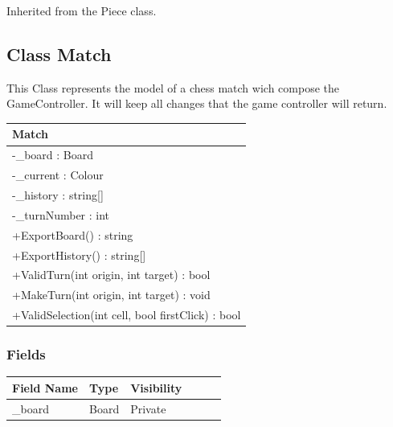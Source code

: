 \documentclass[12pt]{article}
\begin{document}
    Inherited from the Piece class.

\newpage


\subsection{Class Match}

This Class represents the model of a chess match wich compose the
GameController. It will keep all changes that the game controller will return.

\begin{table}[H]
    \begin{tabular}{|l|}
    \hline
    \rowcolor[HTML]{C0C0C0} 
    \textbf{Match}                                    \\ \hline
    \rowcolor[HTML]{EFEFEF} 
    -\_board : Board                                  \\ \hline
    \rowcolor[HTML]{EFEFEF} 
    -\_current : Colour                               \\ \hline
    \rowcolor[HTML]{EFEFEF} 
    -\_history : string{[}{]}                         \\ \hline
    \rowcolor[HTML]{EFEFEF} 
    -\_turnNumber : int                               \\ \hline
    +ExportBoard() : string                           \\ \hline
    +ExportHistory() : string[]                       \\ \hline
    +ValidTurn(int origin, int target) : bool         \\ \hline
    +MakeTurn(int origin, int target) : void          \\ \hline
    +ValidSelection(int cell, bool firstClick) : bool \\ \hline
    \end{tabular}
\end{table}

\subsubsection{Fields}

\begin{table}[H]
    \begin{tabular}{llllll}
    \hline
    \multicolumn{1}{|l|}{\cellcolor[HTML]{EFEFEF}\textbf{Field Name}} & \multicolumn{1}{l|}{\cellcolor[HTML]{EFEFEF}\textbf{Type}} & \multicolumn{1}{l|}{\cellcolor[HTML]{EFEFEF}\textbf{Visibility}} \\ \hline
    \multicolumn{1}{|l|}{\_board}                                     & \multicolumn{1}{l|}{Board}                                 & \multicolumn{1}{l|}{Private}                                     \\ \hline
    \end{tabular}
\end{table}
\end{document}

